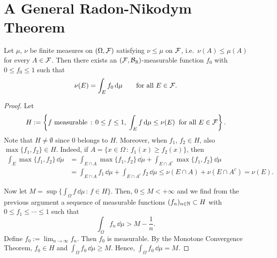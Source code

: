 \section{A General Radon-Nikodym Theorem}


\begin{lemma}\label{lem:partial-radon-nikodym}
	Let $\mu$, $\nu$ be finite measures on $(\Omega,\mathcal F)$ satisfying $\nu\le \mu$ on $\mathcal F$, i.e.\ $\nu(A)\le \mu(A)$ for every $A\in\mathcal F$. Then there exists an $(\mathcal F,\mathcal B_{\mathbb R})$-measurable function $f_0$ with $0\le f_0\le 1$ such that
	\[
		\nu(E) = \int_E f_0\,\mathrm{d}\mu\qquad\text{for all $E\in\mathcal F$}.
	\]
\end{lemma}
\begin{proof}
	Let
	\[
		H := \left\{\text{$f$ measurable}\,:\, 0\le f\le 1,\; \int_E f\,\mathrm{d}\mu \le \nu(E)\;\;\text{for all $E\in\mathcal F$}\right\}.
	\]
	Note that $H\ne \emptyset$ since $0$ belongs to $H$. Moreover, when $f_1$, $f_2\in H$, also $\max\{f_1,f_2\}\in H$. Indeed, if $A=\{x\in\Omega\,:\, f_1(x)\ge f_2(x)\}$, then
	\begin{align*}
		\int_E \max\{f_1,f_2\}\,\dd\mu &= \int_{E\cap A} \max\{f_1,f_2\}\,\dd\mu + \int_{E\cap A^c} \max\{f_1,f_2\}\,\dd\mu \\
		&= \int_{E\cap A} f_1\,\dd\mu + \int_{E\cap A^c} f_2\,\dd\mu \le \nu(E\cap A) + \nu(E\cap A^c) = \nu(E).
	\end{align*}
	
	Now let $M=\sup\{\int_\Omega f\,\dd\mu\,:\,f\in H\}$. Then, $0\le M<+\infty$ and we find from the previous argument a sequence of measurable functions $(f_n)_{n\in\mathbb N}\subset H$ with $0\le f_1\le \cdots\le 1$ such that
	\[
		\int_\Omega f_n\,\dd\mu > M - \frac{1}{n}.
	\] 
	Define $f_0:= \lim_{n\to\infty} f_n$. Then $f_0$ is measurable. By the Monotone Convergence Theorem, $f_0\in H$ and $\int_\Omega f_0\,\dd\mu \ge M$. Hence, $\int_\Omega f_0\,\dd\mu = M$.
	

\end{proof}

